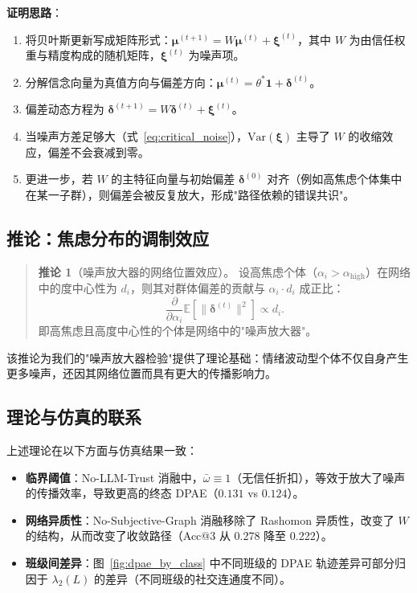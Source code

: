 \documentclass[UTF8, a4paper, 11pt]{ctexart}
\begin{document}
\textbf{证明思路}：
\begin{enumerate}
    \item 将贝叶斯更新写成矩阵形式：$\boldsymbol{\mu}^{(t+1)} = W\boldsymbol{\mu}^{(t)} + \boldsymbol{\xi}^{(t)}$，其中 $W$ 为由信任权重与精度构成的随机矩阵，$\boldsymbol{\xi}^{(t)}$ 为噪声项。
    \item 分解信念向量为真值方向与偏差方向：$\boldsymbol{\mu}^{(t)} = \theta^*\mathbf{1} + \boldsymbol{\delta}^{(t)}$。
    \item 偏差动态方程为 $\boldsymbol{\delta}^{(t+1)} = W\boldsymbol{\delta}^{(t)} + \boldsymbol{\xi}^{(t)}$。
    \item 当噪声方差足够大（式~\eqref{eq:critical_noise}），$\mathrm{Var}(\boldsymbol{\xi})$ 主导了 $W$ 的收缩效应，偏差不会衰减到零。
    \item 更进一步，若 $W$ 的主特征向量与初始偏差 $\boldsymbol{\delta}^{(0)}$ 对齐（例如高焦虑个体集中在某一子群），则偏差会被反复放大，形成"路径依赖的错误共识"。
\end{enumerate}

\subsection{推论：焦虑分布的调制效应}
\begin{quote}
\textbf{推论 1}（噪声放大器的网络位置效应）。
设高焦虑个体（$\alpha_i > \alpha_{\text{high}}$）在网络中的度中心性为 $d_i$，则其对群体偏差的贡献与 $\alpha_i\cdot d_i$ 成正比：
\[
\frac{\partial}{\partial\alpha_i}\mathbb{E}[\|\boldsymbol{\delta}^{(t)}\|^2] \propto d_i.
\]
即高焦虑且高度中心性的个体是网络中的"噪声放大器"。
\end{quote}

该推论为我们的"噪声放大器检验"提供了理论基础：情绪波动型个体不仅自身产生更多噪声，还因其网络位置而具有更大的传播影响力。

\subsection{理论与仿真的联系}
上述理论在以下方面与仿真结果一致：
\begin{itemize}
    \item \textbf{临界阈值}：No-LLM-Trust 消融中，$\bar{\omega}\equiv 1$（无信任折扣），等效于放大了噪声的传播效率，导致更高的终态 DPAE（$0.131$ vs $0.124$）。
    \item \textbf{网络异质性}：No-Subjective-Graph 消融移除了 Rashomon 异质性，改变了 $W$ 的结构，从而改变了收敛路径（Acc@3 从 0.278 降至 0.222）。
    \item \textbf{班级间差异}：图~\ref{fig:dpae_by_class} 中不同班级的 DPAE 轨迹差异可部分归因于 $\lambda_2(L)$ 的差异（不同班级的社交连通度不同）。
\end{itemize}
\end{document}
